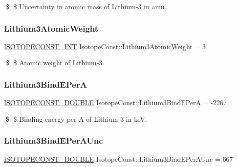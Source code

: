 \$ \$ Uncertainty in atomic mass of Lithium-\/3 in amu. \mbox{\label{group___isotope_const-_lithium-_li3_gac483fca9f737bcb2aee26995c6aa3a17}} 
\subsubsection{\texorpdfstring{Lithium3\+Atomic\+Weight}{Lithium3AtomicWeight}}
{\footnotesize\ttfamily \mbox{\hyperlink{group___isotope_const-_macros_ga5f18360b3e99483a35c32d789e62621c}{I\+S\+O\+T\+O\+P\+E\+C\+O\+N\+S\+T\+\_\+\+I\+NT}} Isotope\+Const\+::\+Lithium3\+Atomic\+Weight = 3}

\$ \$ Atomic weight of Lithium-\/3. \mbox{\label{group___isotope_const-_lithium-_li3_gab11a3b4db8858be96c21388210bf0b93}} 
\subsubsection{\texorpdfstring{Lithium3\+Bind\+E\+PerA}{Lithium3BindEPerA}}
{\footnotesize\ttfamily \mbox{\hyperlink{group___isotope_const-_macros_ga8f45a7272ce02c0b4c65c44636ed719a}{I\+S\+O\+T\+O\+P\+E\+C\+O\+N\+S\+T\+\_\+\+D\+O\+U\+B\+LE}} Isotope\+Const\+::\+Lithium3\+Bind\+E\+PerA = -\/2267}

\$ \$ Binding energy per A of Lithium-\/3 in keV. \mbox{\label{group___isotope_const-_lithium-_li3_gaff1ce83f35fe2cc155665db0ed3b777e}} 
\subsubsection{\texorpdfstring{Lithium3\+Bind\+E\+Per\+A\+Unc}{Lithium3BindEPerAUnc}}
{\footnotesize\ttfamily \mbox{\hyperlink{group___isotope_const-_macros_ga8f45a7272ce02c0b4c65c44636ed719a}{I\+S\+O\+T\+O\+P\+E\+C\+O\+N\+S\+T\+\_\+\+D\+O\+U\+B\+LE}} Isotope\+Const\+::\+Lithium3\+Bind\+E\+Per\+A\+Unc = 667}

